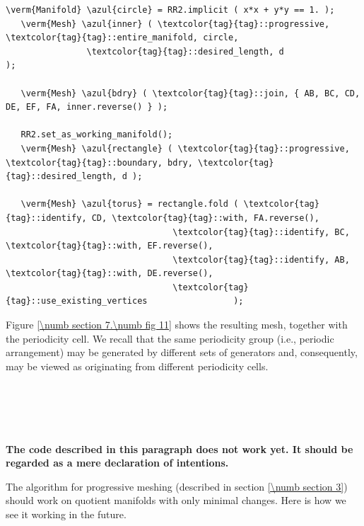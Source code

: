 \begin{Verbatim}[commandchars=\\\{\},formatcom=\small\tt,frame=single,
   label=parag-\ref{\numb section 7.\numb parag 15}.cpp,rulecolor=\color{coment},
   baselinestretch=0.94,framesep=2mm                                             ]
   \verm{Manifold} \azul{circle} = RR2.implicit ( x*x + y*y == 1. );
   \verm{Mesh} \azul{inner} ( \textcolor{tag}{tag}::progressive, \textcolor{tag}{tag}::entire_manifold, circle,
                \textcolor{tag}{tag}::desired_length, d                         );

   \verm{Mesh} \azul{bdry} ( \textcolor{tag}{tag}::join, { AB, BC, CD, DE, EF, FA, inner.reverse() } );

   RR2.set_as_working_manifold();
   \verm{Mesh} \azul{rectangle} ( \textcolor{tag}{tag}::progressive, \textcolor{tag}{tag}::boundary, bdry, \textcolor{tag}{tag}::desired_length, d );

   \verm{Mesh} \azul{torus} = rectangle.fold ( \textcolor{tag}{tag}::identify, CD, \textcolor{tag}{tag}::with, FA.reverse(),
                                 \textcolor{tag}{tag}::identify, BC, \textcolor{tag}{tag}::with, EF.reverse(),
                                 \textcolor{tag}{tag}::identify, AB, \textcolor{tag}{tag}::with, DE.reverse(),
                                 \textcolor{tag}{tag}::use_existing_vertices                 );
\end{Verbatim}

Figure \ref{\numb section 7.\numb fig 11} shows the resulting mesh, together with the
periodicity cell.
We recall that the same periodicity group (i.e., periodic arrangement) may be generated
by different sets of generators and, consequently, may be viewed as originating
from different periodicity cells.


\section{~~}
\label{\numb section 7.\numb parag 17}

{\normalfont\bfseries The code described in this paragraph does not work yet.
It should be regarded as a mere declaration of intentions.}
\medskip
{}

The algorithm for progressive meshing (described in section \ref{\numb section 3})
should work on quotient manifolds with only minimal changes.
Here is how we see it working in the future.

